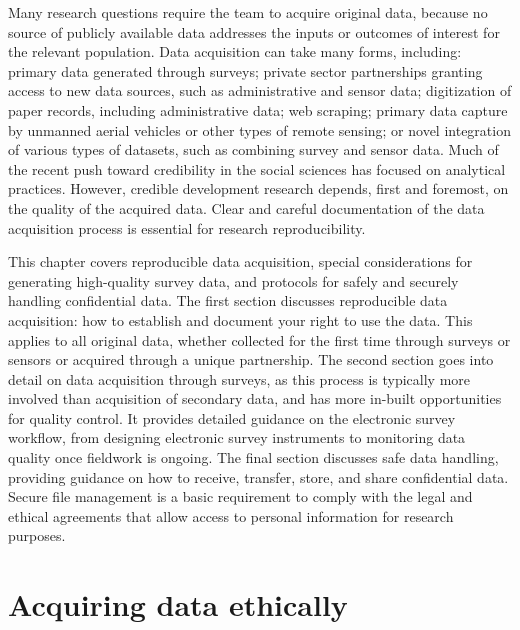 
\begin{fullwidth}
Many research questions require the team to acquire original data,
because no source of publicly available data addresses the
inputs or outcomes of interest for the relevant population.
Data acquisition can take many forms, including:
primary data generated through surveys;
private sector partnerships granting access to new data sources, such as administrative and sensor data;
digitization of paper records, including administrative data; web scraping;
primary data capture by unmanned aerial vehicles or other types of remote sensing;
or novel integration of various types of datasets, such as combining survey and sensor data.
Much of the recent push toward credibility in the social sciences has focused on analytical practices.
However, credible development research depends, first and foremost, on the quality of the acquired data.
Clear and careful documentation of the data acquisition process is essential for research reproducibility.

This chapter covers reproducible data acquisition,
special considerations for generating high-quality survey data,
and protocols for safely and securely handling confidential data.
The first section discusses reproducible data acquisition:
how to establish and document your right to use the data.
This applies to all original data,
whether collected for the first time through surveys or sensors or acquired through a unique partnership.
The second section goes into detail on data acquisition through surveys,
as this process is typically more involved than acquisition of secondary data,
and has more in-built opportunities for quality control.
It provides detailed guidance on the electronic survey workflow,
from designing electronic survey instruments to monitoring data quality once fieldwork is ongoing.
The final section discusses safe data handling,
providing guidance on how to receive, transfer, store, and share confidential data.
Secure file management is a basic requirement to comply with the legal and
ethical agreements that allow  access to personal information for research purposes.


\end{fullwidth}

\section{Acquiring data ethically}

